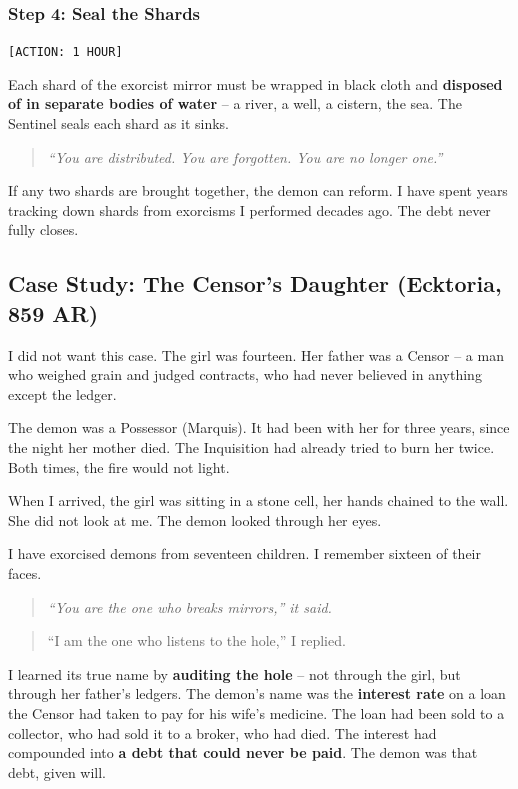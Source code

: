 \subsubsection{Step 4: Seal the Shards} \hfill \texttt{[ACTION: 1 HOUR]}

Each shard of the exorcist mirror must be wrapped in black cloth and \textbf{disposed of in separate bodies of water} -- a river, a well, a cistern, the sea. The Sentinel seals each shard as it sinks.

\begin{quote}\itshape
``You are distributed. You are forgotten. You are no longer one.''
\end{quote}

If any two shards are brought together, the demon can reform. I have spent years tracking down shards from exorcisms I performed decades ago. The debt never fully closes.

\subsection{Case Study: The Censor's Daughter (Ecktoria, 859 AR)}

I did not want this case. The girl was fourteen. Her father was a Censor -- a man who weighed grain and judged contracts, who had never believed in anything except the ledger.

The demon was a Possessor (Marquis). It had been with her for three years, since the night her mother died. The Inquisition had already tried to burn her twice. Both times, the fire would not light.

When I arrived, the girl was sitting in a stone cell, her hands chained to the wall. She did not look at me. The demon looked through her eyes.

I have exorcised demons from seventeen children. I remember sixteen of their faces.

\begin{quote}\itshape
``You are the one who breaks mirrors,'' it said.
\end{quote}
\begin{quote}
``I am the one who listens to the hole,'' I replied.
\end{quote}

I learned its true name by \textbf{auditing the hole} -- not through the girl, but through her father's ledgers. The demon's name was the \textbf{interest rate} on a loan the Censor had taken to pay for his wife's medicine. The loan had been sold to a collector, who had sold it to a broker, who had died. The interest had compounded into \textbf{a debt that could never be paid}. The demon was that debt, given will.

